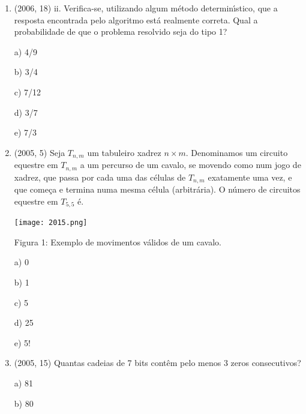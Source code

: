 \documentclass{article}
\begin{document}
\begin{enumerate}
$\frac{3}{12}.\frac{2}{6}=\frac{7}{12}$\newline

d) 7/12\newline


\textbf{CONTEÚDO}

$\rule[1cm]{100cm}{1px}$

primeiramente temos a probavilidade do primeiro algoritmo ser escolhido que e $\frac{1}{3}$ ou $\frac{2}{3}$ e aṕos isso a probabilidade do algoritmo resoover corretamente assim temos $\frac{1}{3}.\frac{3}{4}+\frac{1}{2}.\frac{2}{3}$ que no caso é $\frac{7}{12}$\newpage





\item(2006, 18) ii. Verifica-se, utilizando algum método determinı́stico, que a resposta encontrada pelo algoritmo está realmente correta. Qual a probabilidade de que o problema resolvido seja do tipo 1?

a) 4/9

b) 3/4

c) 7/12

d) 3/7

e) 7/3\newline





\item(2005, 5) Seja $T_{n, m}$ um tabuleiro xadrez $n \times m .$ Denominamos um circuito equestre em $T_{n, m}$ a um percurso de um cavalo, se movendo como num jogo de xadrez, que passa por cada uma das células de $T_{n, m}$ exatamente uma vez, e que começa e termina numa mesma célula (arbitrária). O número de circuitos equestre em $T_{5, 5}$ é. 


\texttt{[image: 2015.png]}\newline


Figura 1: Exemplo de movimentos válidos de um cavalo.

a) 0

b) 1

c) 5

d) 25

e) 5! \newline




\item(2005, 15) Quantas cadeias de 7 bits contêm pelo menos 3 zeros consecutivos?

a) 81

b) 80


\end{enumerate}
\end{document}
